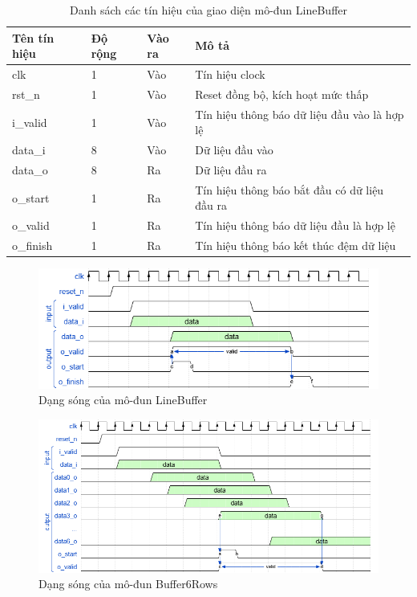 \begin{table}[h]
    \centering
    \renewcommand{\arraystretch}{1.3} %
        \caption{Danh sách các tín hiệu của giao diện mô-đun LineBuffer}
    \begin{tabular}{|p{3cm} p{2cm} p{2cm} p{8cm}|}
        \hline
        \rowcolor{gray!30}
        \textbf{Tên tín hiệu} & \textbf{Độ rộng} & \textbf{Vào ra} & \textbf{Mô tả} \\
        \hline
        clk & 1 & Vào & Tín hiệu clock \\
        \hline
        rst\_n & 1 & Vào & Reset đồng bộ, kích hoạt mức thấp \\
        \hline
        i\_valid & 1 & Vào & Tín hiệu thông báo dữ liệu đầu vào là hợp lệ
        \\ \hline
        data\_i & 8 & Vào & Dữ liệu đầu vào
        \\ \hline
        data\_o & 8 & Ra & Dữ liệu đầu ra
        \\ \hline
        o\_start & 1& Ra & Tín hiệu thông báo bắt đầu có dữ liệu đầu ra
        \\ \hline
        o\_valid & 1& Ra & Tín hiệu thông báo dữ liệu đầu là hợp lệ
        \\ \hline
        o\_finish & 1 & Ra & Tín hiệu thông báo kết thúc đệm dữ liệu        
        \\ \hline
    \end{tabular}

    \label{tab:signalListLineBuffer}
\end{table}
\begin{figure}[!ht]
    \centering
    \includegraphics[width=1\linewidth]{figures/lineBuffer.png}
    \caption{Dạng sóng của mô-đun LineBuffer}
    \label{fig:lineBuffer}
\end{figure}
\begin{figure}[!ht]
    \centering
    \includegraphics[width=1\linewidth]{figures/Buffer6Rows.png}
    \caption{Dạng sóng của mô-đun Buffer6Rows}
    \label{fig:Buffer6Rows}
\end{figure}

